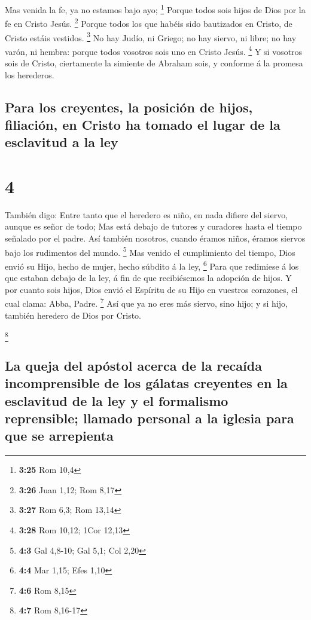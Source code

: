  Mas venida la fe, ya no estamos bajo ayo; \footnote{\textbf{3:25}
  Rom 10,4}  Porque todos sois hijos de Dios por la fe en
Cristo Jesús. \footnote{\textbf{3:26} Juan 1,12; Rom 8,17}
 Porque todos los que habéis sido bautizados en Cristo,
de Cristo estáis vestidos. \footnote{\textbf{3:27} Rom 6,3; Rom 13,14}
 No hay Judío, ni Griego; no hay siervo, ni libre; no hay
varón, ni hembra: porque todos vosotros sois uno en Cristo Jesús.
\footnote{\textbf{3:28} Rom 10,12; 1Cor 12,13}  Y si
vosotros sois de Cristo, ciertamente la simiente de Abraham sois, y
conforme á la promesa los herederos.

\hypertarget{para-los-creyentes-la-posiciuxf3n-de-hijos-filiaciuxf3n-en-cristo-ha-tomado-el-lugar-de-la-esclavitud-a-la-ley}{%
\subsection{Para los creyentes, la posición de hijos, filiación, en
Cristo ha tomado el lugar de la esclavitud a la
ley}\label{para-los-creyentes-la-posiciuxf3n-de-hijos-filiaciuxf3n-en-cristo-ha-tomado-el-lugar-de-la-esclavitud-a-la-ley}}

\hypertarget{section-3}{%
\section{4}\label{section-3}}

 También digo: Entre tanto que el heredero es niño, en
nada difiere del siervo, aunque es señor de todo;  Mas
está debajo de tutores y curadores hasta el tiempo señalado por el
padre.  Así también nosotros, cuando éramos niños, éramos
siervos bajo los rudimentos del mundo. \footnote{\textbf{4:3} Gal
  4,8-10; Gal 5,1; Col 2,20}  Mas venido el cumplimiento
del tiempo, Dios envió su Hijo, hecho de mujer, hecho súbdito á la ley,
\footnote{\textbf{4:4} Mar 1,15; Efes 1,10}  Para que
redimiese á los que estaban debajo de la ley, á fin de que recibiésemos
la adopción de hijos.  Y por cuanto sois hijos, Dios envió
el Espíritu de su Hijo en vuestros corazones, el cual clama: Abba,
Padre. \footnote{\textbf{4:6} Rom 8,15}  Así que ya no
eres más siervo, sino hijo; y si hijo, también heredero de Dios por
Cristo.

\footnote{\textbf{4:7} Rom 8,16-17}

\hypertarget{la-queja-del-apuxf3stol-acerca-de-la-recauxedda-incomprensible-de-los-guxe1latas-creyentes-en-la-esclavitud-de-la-ley-y-el-formalismo-reprensible-llamado-personal-a-la-iglesia-para-que-se-arrepienta}{%
\subsection{La queja del apóstol acerca de la recaída incomprensible de
los gálatas creyentes en la esclavitud de la ley y el formalismo
reprensible; llamado personal a la iglesia para que se
arrepienta}\label{la-queja-del-apuxf3stol-acerca-de-la-recauxedda-incomprensible-de-los-guxe1latas-creyentes-en-la-esclavitud-de-la-ley-y-el-formalismo-reprensible-llamado-personal-a-la-iglesia-para-que-se-arrepienta}}

